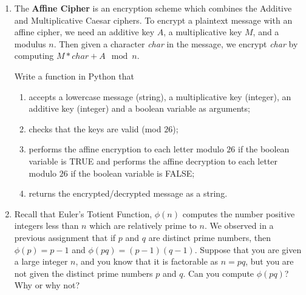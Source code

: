 \documentclass[12pt]{amsart}
\theoremstyle{definition}
\theoremstyle{remark}
\numberwithin{equation}{section}
\begin{document}
\begin{enumerate}
\item The {\bf Affine Cipher} is an encryption scheme which combines the Additive and Multiplicative Caesar ciphers. To encrypt a plaintext message with an affine cipher, we need an additive key $A$, a multiplicative key $M$, and a modulus $n$. Then given a character {\it char} in the message, we encrypt {\it char} by computing $M*char+A \mod n$.

Write a function in Python that 
\begin{enumerate}
\item accepts a lowercase message (string), a multiplicative key (integer), an additive key (integer) and a boolean variable as arguments;
\item checks that the keys are valid (mod $26$);
\item performs the affine encryption to each letter modulo $26$ if the boolean variable is TRUE and performs the affine decryption to each letter modulo $26$ if the boolean variable is FALSE;
\item returns the encrypted/decrypted message as a string.
\end{enumerate}

\item Recall that Euler's Totient Function, $\phi(n)$ computes the number positive integers less than $n$ which are relatively prime to $n$. We observed in a previous assignment that if $p$ and $q$ are distinct prime numbers, then $\phi(p)=p-1$ and $\phi(pq)=(p-1)(q-1)$. Suppose that you are given a large integer $n$, and you know that it is factorable as $n=pq$, but you are not given the distinct prime numbers $p$ and $q$. Can you compute $\phi(pq)$? Why or why not?
\end{enumerate}
\end{document}
